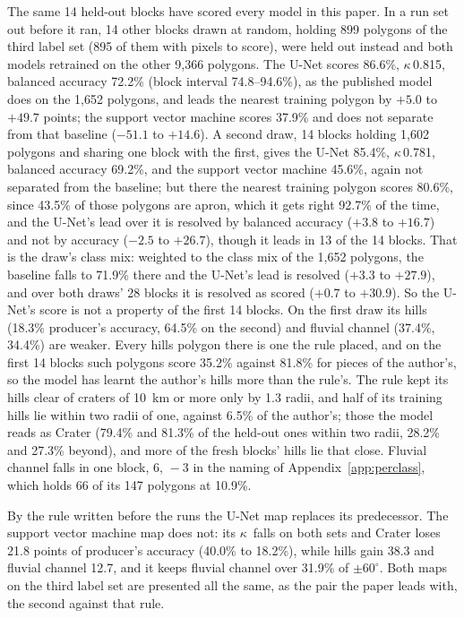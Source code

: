 \documentclass[twocolumn]{aastex701}
\newcommand{\pmsixty}{$\pm60^{\circ}$}
\newcommand{\kap}{$\kappa$}
\begin{document}
The same 14 held-out blocks have scored every model in this paper. In a run set out before it ran, 14 other blocks
drawn at random, holding 899 polygons of the third label set (895 of them with pixels to score), were held out instead and both models retrained on the
other 9,366 polygons. The U-Net scores 86.6\%, \kap\,0.815, balanced accuracy 72.2\% (block interval 74.8--94.6\%),
as the published model does on the 1,652 polygons, and leads the nearest training polygon by $+5.0$ to $+49.7$ points;
the support vector machine scores 37.9\% and does not separate from that baseline ($-51.1$ to $+14.6$). A second draw,
14 blocks holding 1,602 polygons and sharing one block with the first, gives the U-Net 85.4\%, \kap\,0.781, balanced
accuracy 69.2\%, and the support vector machine 45.6\%, again not separated from the baseline; but there the nearest
training polygon scores 80.6\%, since 43.5\% of those polygons are apron, which it gets right 92.7\% of the time, and
the U-Net's lead over it is resolved by balanced accuracy ($+3.8$ to $+16.7$) and not by accuracy ($-2.5$ to $+26.7$),
though it leads in 13 of the 14 blocks. That is the draw's class mix: weighted to the class mix of the 1,652
polygons, the baseline falls to 71.9\% there and the U-Net's lead is resolved ($+3.3$ to $+27.9$), and over both draws' 28
blocks it is resolved as scored ($+0.7$ to $+30.9$). So the U-Net's score is not a property of the first 14 blocks.
On the first draw its hills (18.3\% producer's accuracy, 64.5\%
on the second) and fluvial channel (37.4\%, 34.4\%) are weaker. Every hills polygon there is one the rule placed, and on the first 14 blocks such polygons
score 35.2\% against 81.8\% for pieces of the author's, so the model has learnt the author's hills more than the
rule's. The rule kept its hills clear of craters of 10~km or more only by 1.3 radii, and half of its training hills
lie within two radii of one, against 6.5\% of the author's; those the model reads as Crater (79.4\% and 81.3\% of the
held-out ones within two radii, 28.2\% and 27.3\% beyond), and more of the fresh blocks' hills lie that close.
Fluvial channel falls in one block, $6,\,-3$ in the naming of Appendix~\ref{app:perclass}, which holds 66 of its 147 polygons at 10.9\%. %

By the rule written before the runs the U-Net map replaces its predecessor. The support vector machine map does not:
its \kap\ falls on both sets and Crater loses 21.8 points of producer's accuracy (40.0\% to 18.2\%), while hills gain 38.3
and fluvial channel 12.7, and it keeps fluvial channel over 31.9\% of \pmsixty. Both maps on the third label set are
presented all the same, as the pair the paper leads with, the second against that rule. %
\end{document}
